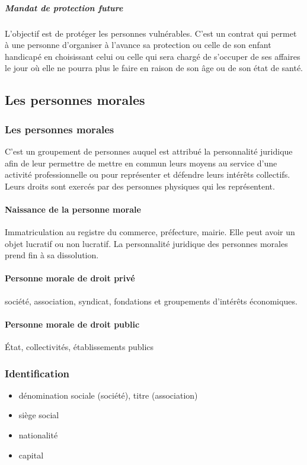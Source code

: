 \documentclass[11pt]{article}
\begin{document}
					\subparagraph{Mandat de protection future} L'objectif est de protéger les personnes vulnérables. C'est un contrat qui permet à une personne d'organiser à l'avance sa protection ou celle de son enfant handicapé en choisissant celui ou celle qui sera chargé de s'occuper de ses affaires le jour où elle ne pourra plus le faire en raison de son âge ou de son état de santé.
					
		\subsection{Les personnes morales}
			\subsubsection{Les personnes morales}
				C'est un groupement de personnes auquel est attribué la personnalité juridique afin de leur permettre de mettre en commun leurs moyens au service d'une activité professionnelle ou pour représenter et défendre leurs intérêts collectifs. Leurs droits sont exercés par des personnes physiques qui les représentent.
				
				\paragraph{Naissance de la personne morale} Immatriculation au registre du commerce, préfecture, mairie. Elle peut avoir un objet lucratif ou non lucratif. La personnalité juridique des personnes morales prend fin à sa dissolution.
				
				\paragraph{Personne morale de droit privé} société, association, syndicat, fondations et groupements d'intérêts économiques.
				
				\paragraph{Personne morale de droit public} État, collectivités, établissements publics
				
			\subsubsection{Identification}
				\begin{itemize}
					\item dénomination sociale (société), titre (association)
					\item siège social
					\item nationalité
					\item capital
				\end{itemize}
				
\end{document}
